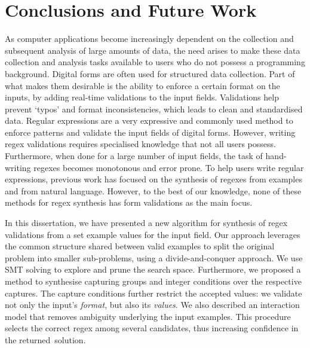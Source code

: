 \chapter{Conclusions and Future Work}
\label{chap:conclusions}

As computer applications become increasingly dependent on the collection and subsequent analysis of large amounts of data, the need arises to make these data collection and analysis tasks available to users who do not possess a programming background.
Digital forms are often used for structured data collection. Part of what makes them desirable is the ability to enforce a certain format on the inputs, by adding real-time validations to the input fields. Validations help prevent `typos' and format inconsistencies, which leads to clean and standardised data.
Regular expressions are a very expressive and commonly used method to enforce patterns and validate the input fields of digital forms.
However, writing regex validations requires specialised knowledge that not all users possess. Furthermore, when done for a large number of input fields, the task of hand-writing regexes becomes monotonous and error prone. To help users write regular expressions, previous work has focused on the synthesis of regexes from examples and from natural language. However, to the best of our knowledge, none of these methods for regex synthesis has form validations as the main focus.

In this dissertation, we have presented a new algorithm for synthesis of regex validations from a set example values for the input field. Our approach leverages the common structure shared between valid examples to split the original problem into smaller sub-problems, using a divide-and-conquer approach.
We use SMT solving to explore and prune the search space.
%
Furthermore, we proposed a method to synthesise capturing groups and integer conditions over the respective captures. The capture conditions further restrict the accepted values: we validate not only the input's \textit{format}, but also its \textit{values}. We also described an interaction model that removes ambiguity underlying the input examples. This procedure selects the correct regex among several candidates, thus increasing confidence in the returned~solution.

